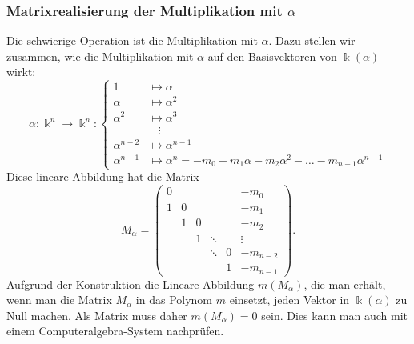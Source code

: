 \subsubsection{Matrixrealisierung der Multiplikation mit $\alpha$}
Die schwierige Operation ist die Multiplikation mit $\alpha$.
Dazu stellen wir zusammen, wie die Multiplikation mit $\alpha$ auf den
Basisvektoren von $\Bbbk(\alpha)$ wirkt:
\[
\alpha\colon
\Bbbk^n\to\Bbbk^n
:
\left\{
\begin{aligned}
     1  &\mapsto \alpha   \\
\alpha  &\mapsto \alpha^2 \\
\alpha^2&\mapsto \alpha^3 \\
        &\phantom{m}\vdots\\
\alpha^{n-2}&\mapsto \alpha^{n-1}\\
\alpha^{n-1}&\mapsto \alpha^n = -m_0-m_1\alpha-m_2\alpha^2-\dots-m_{n-1}\alpha^{n-1}
\end{aligned}
\right.
\]
Diese lineare Abbildung hat die Matrix
\[
M_{\alpha}
=
\begin{pmatrix}
0   &    &    &      &   &-m_0    \\
1   & 0  &    &      &   &-m_1    \\
    & 1  & 0  &      &   &-m_2    \\
    &    & 1  &\ddots&   &\vdots  \\
    &    &    &\ddots& 0 &-m_{n-2}\\
    &    &    &      & 1 &-m_{n-1}
\end{pmatrix}.
\]
Aufgrund der Konstruktion die Lineare Abbildung $m(M_\alpha)$,
die man erhält, wenn
man die Matrix $M_\alpha$ in das Polynom $m$ einsetzt, jeden Vektor
in $\Bbbk(\alpha)$ zu Null machen.
Als Matrix muss daher $m(M_\alpha)=0$ sein.
Dies kann man auch mit einem Computeralgebra-System nachprüfen.

